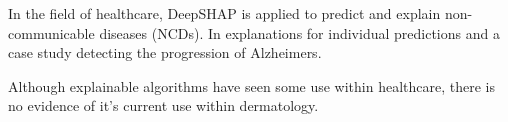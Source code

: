 In the field of healthcare, DeepSHAP is applied to predict and explain non-communicable diseases (NCDs). In explanations for individual predictions and a case study detecting the progression of Alzheimers. 

Although explainable algorithms have seen some use within healthcare, there is no evidence of it's current use within dermatology.



